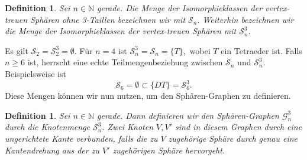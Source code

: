 \documentclass[12pt,titlepage,twoside,cleardoublepage]{article}
\theoremstyle{nummermitklammern}
\newtheorem{definition}[temp]{Definition}
\newtheorem{definition}[zahl]{Definition}
\numberwithin{equation}{section}
\begin{document}
\begin{definition}
Sei $n\in \mathbb{N}$ gerade. Die Menge der Isomorphieklassen der vertex-treuen Sphären ohne 3-Taillen bezeichnen wir mit $\mathcal{S}_n.$ Weiterhin bezeichnen wir die Menge der Isomorphieklassen der vertex-treuen Sphären mit $\mathcal{S}_n^3.$
\end{definition} 
 Es gilt $\mathcal{S}_2=\mathcal{S}_2^3=\emptyset.$ 
 Für $n=4$ ist $\mathcal{S}_n^3=\mathcal{S}_n=\{T\},$ wobei $T$ ein Tetraeder ist.
 Falls $n\geq 6$ ist, herrscht eine echte Teilmengenbeziehung zwischen $\mathcal{S}_n$ und $\mathcal{S}_n^3.$ Beispielsweise ist 
 \[
 \mathcal{S}_6=\emptyset \subset \{DT\}=\mathcal{S}_6^3.
 \]
 Diese Mengen können wir nun nutzen, um den Sphären-Graphen zu definieren. 
 \begin{definition}
Sei $n\in \mathbb{N}$ gerade. Dann definieren wir den \emph{Sphären-Graphen} $\mathcal{G}^3_n$ durch die Knotenmenge $\mathcal{S}^3_n.$ Zwei Knoten $V,V'$ sind in diesem Graphen durch eine ungerichtete Kante verbunden, falls die zu $V$ zugehörige Sphäre durch genau eine Kantendrehung aus der zu $V'$ zugehörigen Sphäre hervorgeht. 
 \end{definition}
\end{document}
